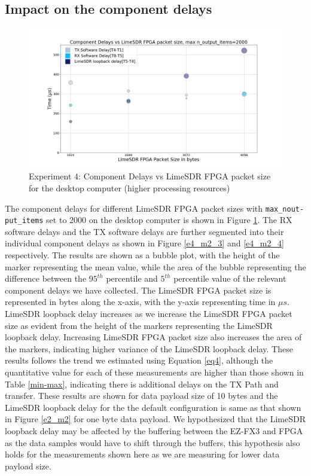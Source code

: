 \subsection{Impact on the component delays}
\begin{figure}[h!]
\centering
\includegraphics[width=\textwidth]{Thesis/Figure/E4M2-2.png}
\caption{Experiment 4: Component Delays vs LimeSDR FPGA packet size for the desktop computer (higher processing resources)}
\label{e4_m2_2}
\end{figure}

The component delays for different LimeSDR FPGA packet sizes with \texttt{max\_nout-put\_items} set to 2000 on the desktop computer is shown in Figure \ref{e4_m2_2}.
The RX software delays and the TX software delays are further segmented into their individual component delays as shown in Figure \ref{e4_m2_3} and \ref{e4_m2_4} respectively.
The results are shown as a bubble plot, with the height of the marker representing the mean value, while the area of the bubble representing the difference between the $95^{th}$ percentile and $5^{th}$ percentile value of the relevant component delays we have collected.
The LimeSDR FPGA packet size is represented in bytes along the x-axis, with the y-axis representing time in $\mu s$.\\

LimeSDR loopback delay increases as we increase the LimeSDR FPGA packet size as evident from the height of the markers representing the LimeSDR loopback delay.
Increasing LimeSDR FPGA packet size also increases the area of the markers, indicating higher variance of the LimeSDR loopback delay. 
These results follows the trend we estimated using Equation \ref{eq4}, although the quantitative value for each of these measurements are higher than those shown in Table \ref{min-max}, indicating there is additional delays on the TX Path and transfer.
These results are shown for data payload size of 10 bytes and the LimeSDR loopback delay for the the default configuration is same as that shown in Figure \ref{e2_m2} for one byte data payload.
We hypothesized that the LimeSDR loopback delay may be affected by the buffering between the EZ-FX3 and FPGA as the data samples would have to shift through the buffers, this hypothesis also holds for the measurements shown here as we are measuring for lower data payload size.\\

